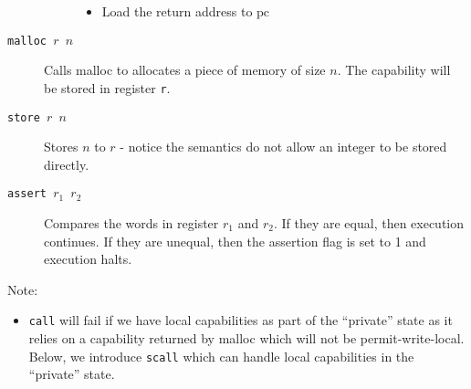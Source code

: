 \documentclass[a4paper]{article}
\newcommand{\var}[1]{\mathit{#1}}
\newcommand{\pcreg}{\mathrm{pc}}
\begin{document}
\begin{description}
\begin{description}
\begin{itemize}
    \item Load the return address to $\pcreg$
    \end{itemize}
\end{description}
\item[\texttt{malloc $r$ $n$}] Calls malloc to allocates a piece of memory of size $n$. The capability will be stored in register \texttt{r}.
\item[\texttt{store $r$ $n$}] Stores $n$ to $r$ - notice the semantics do not allow an integer to be stored directly.
\item[\texttt{assert $r_1$ $r_2$}] Compares the words in register $r_1$ and $r_2$. If they are equal, then execution continues. If they are unequal, then the assertion flag is set to 1 and execution halts.
\end{description}
Note:
\begin{itemize}
\item \texttt{call} will fail if we have local capabilities as part of the ``private'' state as it relies on a capability returned by malloc which will not be permit-write-local. Below, we introduce \texttt{scall} which can handle local capabilities in the ``private'' state.
\end{itemize}
\end{document}
